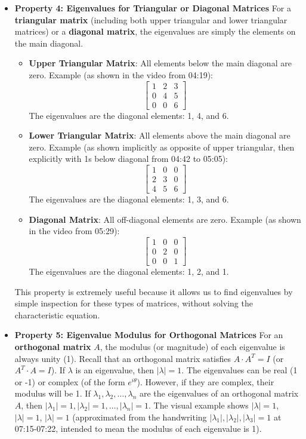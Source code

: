 \documentclass{article}
\begin{document}
\begin{itemize}
    \item \textbf{Property 4: Eigenvalues for Triangular or Diagonal Matrices}
    For a \textbf{triangular matrix} (including both upper triangular and lower triangular matrices) or a \textbf{diagonal matrix}, the eigenvalues are simply the elements on the main diagonal.
    \begin{itemize}
        \item \textbf{Upper Triangular Matrix}: All elements below the main diagonal are zero.
        Example (as shown in the video from 04:19):
        \[ \begin{bmatrix} 1 & 2 & 3 \\ 0 & 4 & 5 \\ 0 & 0 & 6 \end{bmatrix} \]
        The eigenvalues are the diagonal elements: 1, 4, and 6.
        \item \textbf{Lower Triangular Matrix}: All elements above the main diagonal are zero.
        Example (as shown implicitly as opposite of upper triangular, then explicitly with 1s below diagonal from 04:42 to 05:05):
        \[ \begin{bmatrix} 1 & 0 & 0 \\ 2 & 3 & 0 \\ 4 & 5 & 6 \end{bmatrix} \]
        The eigenvalues are the diagonal elements: 1, 3, and 6.
        \item \textbf{Diagonal Matrix}: All off-diagonal elements are zero.
        Example (as shown in the video from 05:29):
        \[ \begin{bmatrix} 1 & 0 & 0 \\ 0 & 2 & 0 \\ 0 & 0 & 1 \end{bmatrix} \]
        The eigenvalues are the diagonal elements: 1, 2, and 1.
    \end{itemize}
    This property is extremely useful because it allows us to find eigenvalues by simple inspection for these types of matrices, without solving the characteristic equation.

    \item \textbf{Property 5: Eigenvalue Modulus for Orthogonal Matrices}
    For an \textbf{orthogonal matrix} $A$, the modulus (or magnitude) of each eigenvalue is always unity (1). Recall that an orthogonal matrix satisfies $A \cdot A^T = I$ (or $A^T \cdot A = I$). If $\lambda$ is an eigenvalue, then $| \lambda | = 1$. The eigenvalues can be real (1 or -1) or complex (of the form $e^{i\theta}$). However, if they are complex, their modulus will be 1.
    If $\lambda_1, \lambda_2, \dots, \lambda_n$ are the eigenvalues of an orthogonal matrix $A$, then $|\lambda_1|=1, |\lambda_2|=1, \dots, |\lambda_n|=1$. The visual example shows $|\lambda|=1$, $|\lambda|=1$, $|\lambda|=1$ (approximated from the handwriting $\left|\lambda_{1}\right|,\left|\lambda_{2}\right|,\left|\lambda_{3}\right|=1$ at 07:15-07:22, intended to mean the modulus of each eigenvalue is 1).


\end{itemize}
\end{document}
